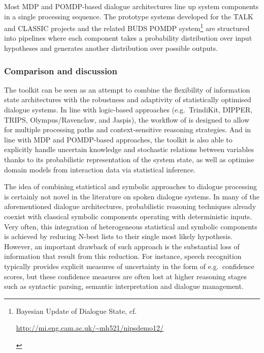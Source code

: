Most MDP and POMDP-based dialogue architectures line up system components in a single processing sequence. The prototype systems developed for the TALK and CLASSIC projects \citep{Henderson:2008,Lemon:2012} and the related BUDS POMDP system\footnote{Bayesian Update of Dialogue State, cf. \begin{scriptsize}\url{http://mi.eng.cam.ac.uk/~mh521/nipsdemo12/}\end{scriptsize}} are structured into pipelines where each component takes a probability distribution over input hypotheses and generates another distribution over possible outputs.  



\subsubsection*{Comparison and discussion}

The \opendial{} toolkit can be seen as an attempt to combine the flexibility of information state architectures with the robustness and adaptivity of statistically optimised dialogue systems.  In line with logic-based approaches (e.g.\ TrindiKit, DIPPER, TRIPS, Olympus/Ravenclaw, and Jaspis), the workflow of \opendial{} is designed to allow for multiple processing paths and context-sensitive reasoning strategies.  And in line with MDP and POMDP-based approaches, the toolkit is also able to explicitly handle uncertain knowledge and stochastic relations between variables thanks to its probabilistic representation of the system state, as well as optimise domain models from interaction data via statistical inference.  

The idea of combining statistical and symbolic approaches to dialogue processing is certainly not novel in the literature on spoken dialogue systems.  In many of the aforementioned dialogue architectures, probabilistic reasoning techniques already coexist with classical symbolic components operating with deterministic inputs. Very often, this integration of heterogeneous statistical and symbolic components is achieved by reducing N-best lists to their single most likely hypothesis. However, an important drawback of such approach is the substantial loss of information that result from this reduction. For instance, speech recognition typically provides explicit measures of uncertainty in the form of e.g.\ confidence scores, but these confidence measures are often lost at higher reasoning stages such as syntactic parsing, semantic interpretation and dialogue management. 

